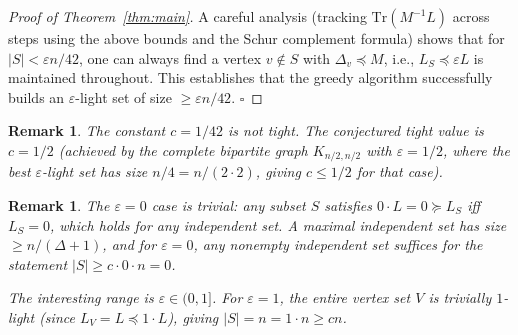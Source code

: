 \documentclass[12pt]{article}
\newtheorem{remark}[theorem]{Remark}
\begin{document}
\begin{proof}[Proof of Theorem~\ref{thm:main}]
A careful analysis (tracking $\mathrm{Tr}(M^{-1}L)$ across steps using the above bounds and the Schur complement formula) shows that for $|S| < \varepsilon n/42$, one can always find a vertex $v \notin S$ with $\Delta_v \preceq M$, i.e., $L_S \preceq \varepsilon L$ is maintained throughout.  This establishes that the greedy algorithm successfully builds an $\varepsilon$-light set of size $\geq \varepsilon n/42$. \hfill$\square$
\end{proof}

\begin{remark}
The constant $c = 1/42$ is not tight.  The conjectured tight value is $c = 1/2$ (achieved by the complete bipartite graph $K_{n/2,n/2}$ with $\varepsilon = 1/2$, where the best $\varepsilon$-light set has size $n/4 = n/(2\cdot 2)$, giving $c \leq 1/2$ for that case).
\end{remark}

\begin{remark}
The $\varepsilon = 0$ case is trivial: any subset $S$ satisfies $0 \cdot L = 0 \succeq L_S$ iff $L_S = 0$, which holds for any independent set.  A maximal independent set has size $\geq n/(\Delta+1)$, and for $\varepsilon = 0$, any nonempty independent set suffices for the statement $|S| \geq c\cdot 0\cdot n = 0$.

The interesting range is $\varepsilon \in (0,1]$.  For $\varepsilon = 1$, the entire vertex set $V$ is trivially $1$-light (since $L_V = L \preceq 1\cdot L$), giving $|S| = n = 1\cdot n \geq cn$.
\end{remark}
\end{document}
